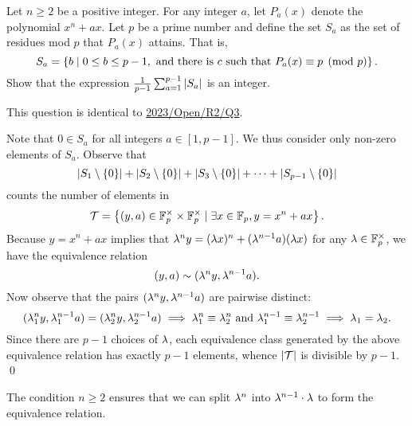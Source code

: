 \begin{question}\label{A::2022-O-2-5}
    Let $n \geq 2$ be a positive integer. For any integer $a$, let $P_a(x)$ denote the polynomial $x^n + ax$. Let $p$ be a prime number and define the set $S_a$ as the set of residues mod $p$ that $P_a(x)$ attains. That is, \[S_a = \left\lbrace b \mid 0 \leq b \leq p -1, \text{ and there is $c$ such that $P_a(x) \equiv p \pmod{p}$} \right\rbrace.\] Show that the expression $\frac1{p-1} \sum_{a=1}^{p-1} \left\lvert S_a \right\rvert$ is an integer.
\end{question}
\begin{remark}
    This question is identical to \hyperref[A::2023-O-2-3]{2023/Open/R2/Q3}.
\end{remark}
\begin{solution*}
    Note that $0 \in S_a$ for all integers $a \in [1, p-1]$. We thus consider only non-zero elements of $S_a$. Observe that \[\left\lvert S_1 \setminus \left\lbrace 0 \right\rbrace \right\rvert + \left\lvert S_2 \setminus \left\lbrace 0 \right\rbrace \right\rvert + \left\lvert S_3 \setminus \left\lbrace 0 \right\rbrace \right\rvert + \cdots + \left\lvert S_{p-1} \setminus \left\lbrace 0 \right\rbrace \right\rvert\] counts the number of elements in \[\mathcal{T} = \left\lbrace (y, a) \in \mathbb{F}_p^\times \times \mathbb{F}_p^\times \mid \exists x \in \mathbb{F}_p, y = x^n + ax \right\rbrace.\] Because $y = x^n + ax$ implies that $\lambda^n y = (\lambda x)^n + (\lambda^{n-1} a)(\lambda x)$ for any $\lambda \in \mathbb{F}_p^\times$, we have the equivalence relation \[(y, a) \sim (\lambda^n y, \lambda^{n-1} a).\] Now observe that the pairs $(\lambda^n y, \lambda^{n-1} a)$ are pairwise distinct: \[(\lambda_1^n y, \lambda_1^{n-1} a) = (\lambda_2^n y, \lambda_2^{n-1} a) \implies \lambda_1^n \equiv \lambda_2^n \text{ and } \lambda_1^{n-1} \equiv \lambda_2^{n-1} \implies \lambda_1 = \lambda_2.\] Since there are $p-1$ choices of $\lambda$, each equivalence class generated by the above equivalence relation has exactly $p-1$ elements, whence $\left\lvert \mathcal{T} \right\rvert$ is divisible by $p-1$. \qed

    \begin{remark}
        The condition $n \geq 2$ ensures that we can split $\lambda^n$ into $\lambda^{n-1} \cdot \lambda$ to form the equivalence relation.
    \end{remark}
\end{solution*}
